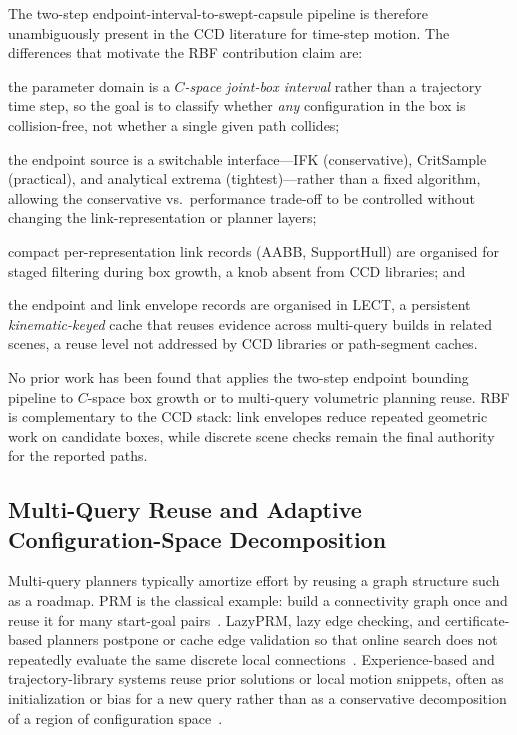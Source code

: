 \documentclass[journal]{IEEEtran}
\DeclareRobustCommand{\textsc}[1]{\textnormal{\MakeUppercase{#1}}}
\newcommand{\rbf}{\textsc{RBF}}
\begin{document}
The two-step endpoint-interval-to-swept-capsule pipeline is therefore
unambiguously present in the CCD literature for time-step motion.
The differences that motivate the \rbf{} contribution claim are:
\begin{enumerate*}[label=(\alph*)]
  \item the parameter domain is a \emph{$C$-space joint-box interval} rather
    than a trajectory time step, so the goal is to classify whether \emph{any}
    configuration in the box is collision-free, not whether a single given path
    collides;
  \item the endpoint source is a switchable interface---IFK (conservative),
    CritSample (practical), and analytical extrema (tightest)---rather than a
    fixed algorithm, allowing the conservative vs.\ performance trade-off to be
    controlled without changing the link-representation or planner layers;
  \item compact per-representation link records (AABB, SupportHull) are
    organised for staged filtering during box growth, a knob absent from CCD
    libraries; and
  \item the endpoint and link envelope records are organised in LECT, a
    persistent \emph{kinematic-keyed} cache that reuses evidence across
    multi-query builds in related scenes, a reuse level not addressed by CCD
    libraries or path-segment caches.
\end{enumerate*}
No prior work has been found that applies the two-step endpoint bounding
pipeline to $C$-space box growth or to multi-query volumetric planning reuse.
\rbf{} is complementary to the CCD stack: link envelopes reduce repeated
geometric work on candidate boxes, while discrete scene checks remain the final
authority for the reported paths.

\subsection{Multi-Query Reuse and Adaptive Configuration-Space Decomposition}

Multi-query planners typically amortize effort by reusing a graph structure such
as a roadmap. PRM is the classical example: build a connectivity graph once and
reuse it for many start-goal pairs~\cite{kavraki1996probabilistic,
bohlin2000path}. LazyPRM, lazy edge checking, and certificate-based planners
postpone or cache edge validation so that online search does not repeatedly
evaluate the same discrete local connections~\cite{dellin2016unifying,
schmerling2015optimal}. Experience-based and trajectory-library systems reuse
prior solutions or local motion snippets, often as initialization or bias for a
new query rather than as a conservative decomposition of a region of
configuration space~\cite{coleman2014moveit}.
\end{document}
